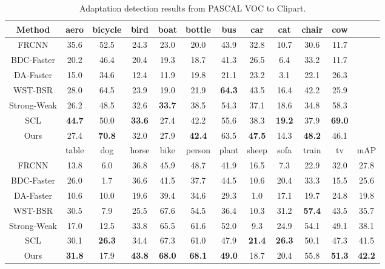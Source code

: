 \documentclass[runningheads]{llncs}
\begin{document}
\begin{table*}[t]
\centering
\caption{Adaptation detection results from PASCAL VOC to Clipart.}
\begin{tabular}{c|cccccccccc|c}
\hline
Method&aero&bicycle&bird&boat&bottle&bus&car&cat&chair&cow&\\
\hline
FRCNN \cite{DBLP:journals/pami/RenHG017}&35.6& 52.5& 24.3& 23.0& 20.0& 43.9& 32.8& 10.7& 30.6& 11.7& \\
BDC-Faster \cite{DBLP:conf/cvpr/SaitoUHS19}&20.2& 46.4& 20.4& 19.3& 18.7& 41.3& 26.5& 6.4& 33.2& 11.7&\\
DA-Faster \cite{DBLP:conf/cvpr/Chen0SDG18}&15.0& 34.6& 12.4& 11.9& 19.8& 21.1& 23.2& 3.1& 22.1& 26.3&\\
WST-BSR \cite{DBLP:journals/corr/abs-1909-00597}&28.0& 64.5& 23.9& 19.0& 21.9& \bf64.3& 43.5& 16.4& 42.2& 25.9& \\
Strong-Weak \cite{DBLP:conf/cvpr/SaitoUHS19}& 26.2& 48.5& 32.6& \bf33.7& 38.5& 54.3& 37.1& 18.6& 34.8& 58.3&\\
SCL \cite{DBLP:journals/corr/abs-1911-02559}&\bf44.7& 50.0& \bf33.6& 27.4& 42.2& 55.6& 38.3& \bf19.2& 37.9& \bf69.0& \\
Ours   &27.4&\bf70.8& 32.0& 27.9& \bf42.4& 63.5& \bf47.5&14.3&\bf48.2&46.1&\\
\hline
\hline
&table&dog&horse&bike&person&plant&sheep&sofa&train&tv&mAP\\
FRCNN \cite{DBLP:journals/pami/RenHG017}&13.8& 6.0& 36.8& 45.9& 48.7& 41.9& 16.5& 7.3& 22.9& 32.0& 27.8 \\
BDC-Faster \cite{DBLP:conf/cvpr/SaitoUHS19}&26.0& 1.7& 36.6& 41.5& 37.7& 44.5& 10.6& 20.4& 33.3& 15.5& 25.6  \\
DA-Faster \cite{DBLP:conf/cvpr/Chen0SDG18}&10.6& 10.0& 19.6& 39.4& 34.6& 29.3& 1.0& 17.1& 19.7& 24.8&19.8  \\
WST-BSR \cite{DBLP:journals/corr/abs-1909-00597}&30.5& 7.9& 25.5& 67.6& 54.5& 36.4& 10.3& 31.2& \bf57.4& 43.5& 35.7\\
Strong-Weak \cite{DBLP:conf/cvpr/SaitoUHS19}&17.0& 12.5& 33.8& 65.5& 61.6& 52.0& 9.3& 24.9& 54.1& 49.1&38.1 \\
SCL \cite{DBLP:journals/corr/abs-1911-02559}&30.1& \bf26.3& 34.4& 67.3& 61.0& 47.9& \bf21.4& \bf26.3& 50.1& 47.3&41.5 \\
Ours   &\bf31.8&17.9&\bf43.8 &\bf68.0&\bf68.1&\bf49.0&18.7&20.4&55.8&\bf51.3&\bf42.2 \\
\hline
\end{tabular}
\label{table:voc2clipart}
\end{table*}
\end{document}
